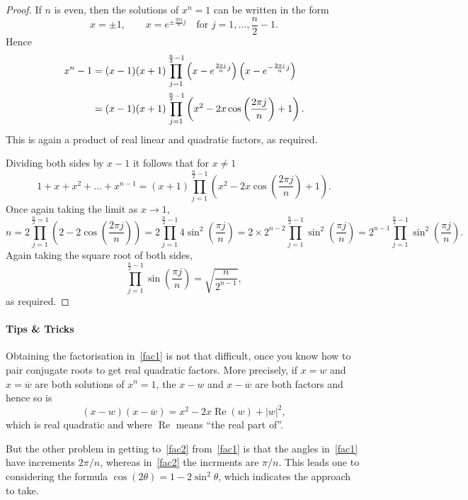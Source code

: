 \documentclass[11pt,a4paper]{report}
\theoremstyle{plain}
\theoremstyle{definition}
\renewcommand{\Re}{\operatorname{Re}}
\begin{document}
\begin{proof}
\bigskip
If $ n $ is even, then the solutions of $ x^n = 1 $ can be written in the form 
\[
x=\pm 1, \qquad x = e^{\pm   \frac{2\pi i }{n}j} \quad \text{for } j =1,\dots, \frac{n}{2}-1.
\]
Hence 
\begin{align}
x^n - 1 &= (x-1)(x+1)   \prod_{j=1}^{\frac{n}{2}-1} \left(x- e^{  \frac{2\pi i }{n}j} \right) \left(x- e^{-  \frac{2\pi i }{n}j} \right) \notag\\
	&= (x-1)(x+1)  \prod_{j=1}^{\frac{n}{2}-1} \left( x^2 - 2x\cos\left(\frac{2\pi j}{n}   \right) +1 \right).
\end{align}
This is again a product of real linear and quadratic factors, as required.

\bigskip
Dividing both sides by $ x-1 $ it follows that for $ x\neq 1  $
\[
1+x+x^2 + \dots + x^{n-1} = (x+1)\prod_{j=1}^{\frac{n}{2}-1} \left( x^2 - 2x\cos\left(\frac{2\pi j}{n}  \right) +1 \right).
\]
Once again taking the limit as $ x\to 1 $, 
\[
n  = 2\prod_{j=1}^{\frac{n}{2}=1} \left(  2 - 2 \cos\left(\frac{2\pi j}{n}   \right)   \right)  
	 = 2 \prod_{j=1}^{\frac{n}{2}-1}  4 \sin^2 \left(\frac{ \pi j}{n} \right)    
	 = 2 \times 2^{n-2}  \prod_{j=1}^{\frac{n}{2}-1}    \sin^2 \left(\frac{ \pi j}{n} \right) 
	 =   2^{n-1}  \prod_{j=1}^{\frac{n}{2}-1}    \sin^2 \left(\frac{ \pi j}{n} \right) .
\]
Again taking the square root of both sides,
\begin{equation} \label{} 
\prod_{j=1}^{\frac{n}{2}-1}    \sin  \left(\frac{ \pi j}{n} \right) = \sqrt{\frac{n}{2^{n-1}}},
\end{equation} 
as required.
\end{proof} 



\bigskip

\paragraph{Tips \& Tricks} Obtaining the  factorisation in~\eqref{fac1} is not that difficult, once you know how to pair conjugate  roots to get real quadratic factors.  
More precisely, if $ x=w $ and $ x= \overline{w} $ are both solutions of $ x^n = 1 $, the $ x-w $ and $ x - \overline{w} $ are both factors and hence so is 
\[ (x-w)(x-\overline{w} ) = x^2 - 2 x \Re(w) + |w|^2, \]   
which is real quadratic and where $ \Re $ means ``the real part of''.

But the other problem in getting to~\eqref{fac2} from~\eqref{fac1} is that the angles in~\eqref{fac1} have increments $ 2\pi/n $, whereas in~\eqref{fac2} the incrments are $ \pi/n $.  This leads one to considering the formula $ \cos (2\theta) = 1 - 2\sin^2 \theta $, which indicates the approach to take.  
\end{document}
